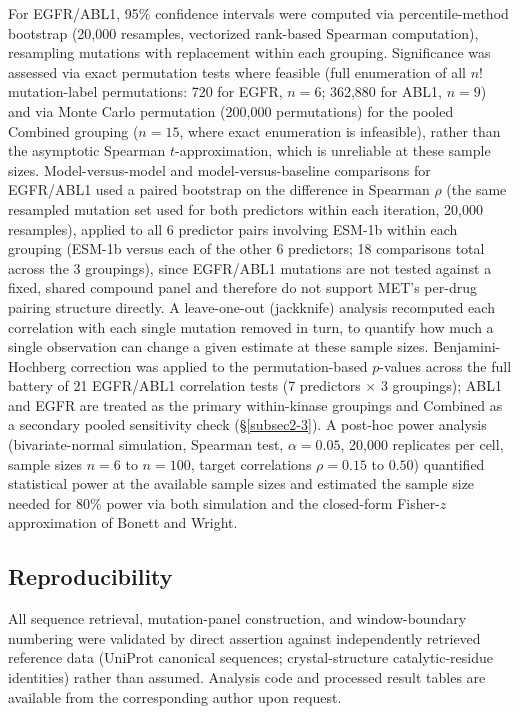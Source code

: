 \documentclass[pdflatex,sn-mathphys-num]{sn-jnl}%
\theoremstyle{thmstyleone}%
\theoremstyle{thmstyletwo}%
\theoremstyle{thmstylethree}%
\begin{document}
For EGFR/ABL1, 95\% confidence intervals were computed via percentile-method bootstrap (20{,}000 resamples, vectorized rank-based Spearman computation), resampling mutations with replacement within each grouping. Significance was assessed via exact permutation tests where feasible (full enumeration of all $n!$ mutation-label permutations: 720 for EGFR, $n=6$; 362{,}880 for ABL1, $n=9$) and via Monte Carlo permutation (200{,}000 permutations) for the pooled Combined grouping ($n=15$, where exact enumeration is infeasible), rather than the asymptotic Spearman $t$-approximation, which is unreliable at these sample sizes. Model-versus-model and model-versus-baseline comparisons for EGFR/ABL1 used a paired bootstrap on the difference in Spearman $\rho$ (the same resampled mutation set used for both predictors within each iteration, 20{,}000 resamples), applied to all 6 predictor pairs involving ESM-1b within each grouping (ESM-1b versus each of the other 6 predictors; 18 comparisons total across the 3 groupings), since EGFR/ABL1 mutations are not tested against a fixed, shared compound panel and therefore do not support MET's per-drug pairing structure directly. A leave-one-out (jackknife) analysis recomputed each correlation with each single mutation removed in turn, to quantify how much a single observation can change a given estimate at these sample sizes. Benjamini-Hochberg correction \citep{BenjaminiHochberg1995} was applied to the permutation-based $p$-values across the full battery of 21 EGFR/ABL1 correlation tests (7 predictors $\times$ 3 groupings); ABL1 and EGFR are treated as the primary within-kinase groupings and Combined as a secondary pooled sensitivity check (\S\ref{subsec2-3}). A post-hoc power analysis (bivariate-normal simulation, Spearman test, $\alpha=0.05$, 20{,}000 replicates per cell, sample sizes $n=6$ to $n=100$, target correlations $\rho=0.15$ to $0.50$) quantified statistical power at the available sample sizes and estimated the sample size needed for 80\% power via both simulation and the closed-form Fisher-$z$ approximation of Bonett and Wright.

\subsection{Reproducibility}\label{subsec3-6}

All sequence retrieval, mutation-panel construction, and window-boundary numbering were validated by direct assertion against independently retrieved reference data (UniProt canonical sequences; crystal-structure catalytic-residue identities) rather than assumed. Analysis code and processed result tables are available from the corresponding author upon request.
\end{document}
